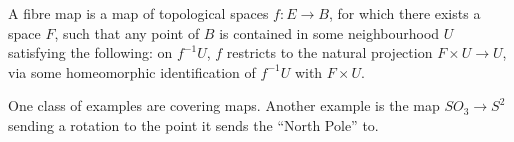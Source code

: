 \documentclass[12pt]{article}
\begin{document}
A fibre map is a map of topological spaces $f: E \rightarrow B$, for which  there exists a space $F$, such that any point of $B$ is contained in some neighbourhood $U$ satisfying the following: on $f^{-1}U$, $f$ restricts to the natural projection $F \times U \rightarrow U$, via some homeomorphic identification of $f^{-1}U$ with $F \times U$.  

One class of examples are covering maps.  Another example is the map $SO_3 \rightarrow S^2$ sending a rotation to the point it sends the ``North Pole'' to.
\end{document}
